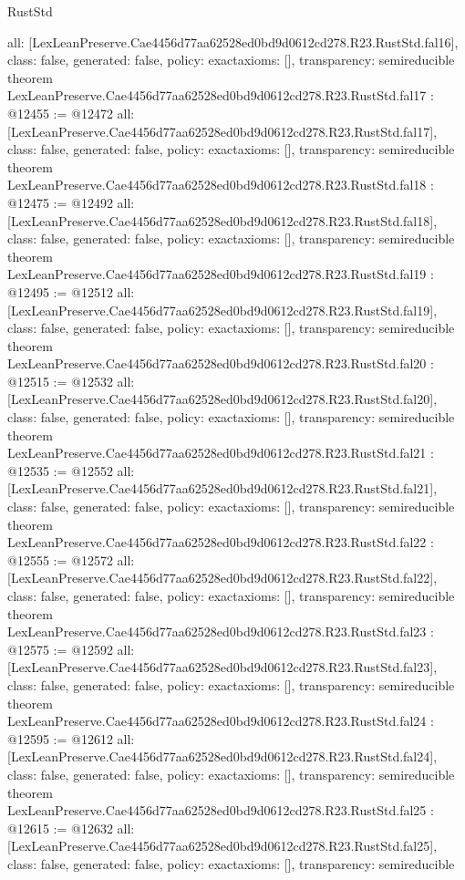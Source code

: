 \begin{lexlean}{RustStd}
\begin{coremodule}
{  all: [LexLeanPreserve.Cae4456d77aa62528ed0bd9d0612cd278.R23.RustStd.fal16],
  class: false,
  generated: false,
  policy: exact{axioms: []},
  transparency: semireducible
}
theorem LexLeanPreserve.Cae4456d77aa62528ed0bd9d0612cd278.R23.RustStd.fal17 : @12455 := @12472 {
  all: [LexLeanPreserve.Cae4456d77aa62528ed0bd9d0612cd278.R23.RustStd.fal17],
  class: false,
  generated: false,
  policy: exact{axioms: []},
  transparency: semireducible
}
theorem LexLeanPreserve.Cae4456d77aa62528ed0bd9d0612cd278.R23.RustStd.fal18 : @12475 := @12492 {
  all: [LexLeanPreserve.Cae4456d77aa62528ed0bd9d0612cd278.R23.RustStd.fal18],
  class: false,
  generated: false,
  policy: exact{axioms: []},
  transparency: semireducible
}
theorem LexLeanPreserve.Cae4456d77aa62528ed0bd9d0612cd278.R23.RustStd.fal19 : @12495 := @12512 {
  all: [LexLeanPreserve.Cae4456d77aa62528ed0bd9d0612cd278.R23.RustStd.fal19],
  class: false,
  generated: false,
  policy: exact{axioms: []},
  transparency: semireducible
}
theorem LexLeanPreserve.Cae4456d77aa62528ed0bd9d0612cd278.R23.RustStd.fal20 : @12515 := @12532 {
  all: [LexLeanPreserve.Cae4456d77aa62528ed0bd9d0612cd278.R23.RustStd.fal20],
  class: false,
  generated: false,
  policy: exact{axioms: []},
  transparency: semireducible
}
theorem LexLeanPreserve.Cae4456d77aa62528ed0bd9d0612cd278.R23.RustStd.fal21 : @12535 := @12552 {
  all: [LexLeanPreserve.Cae4456d77aa62528ed0bd9d0612cd278.R23.RustStd.fal21],
  class: false,
  generated: false,
  policy: exact{axioms: []},
  transparency: semireducible
}
theorem LexLeanPreserve.Cae4456d77aa62528ed0bd9d0612cd278.R23.RustStd.fal22 : @12555 := @12572 {
  all: [LexLeanPreserve.Cae4456d77aa62528ed0bd9d0612cd278.R23.RustStd.fal22],
  class: false,
  generated: false,
  policy: exact{axioms: []},
  transparency: semireducible
}
theorem LexLeanPreserve.Cae4456d77aa62528ed0bd9d0612cd278.R23.RustStd.fal23 : @12575 := @12592 {
  all: [LexLeanPreserve.Cae4456d77aa62528ed0bd9d0612cd278.R23.RustStd.fal23],
  class: false,
  generated: false,
  policy: exact{axioms: []},
  transparency: semireducible
}
theorem LexLeanPreserve.Cae4456d77aa62528ed0bd9d0612cd278.R23.RustStd.fal24 : @12595 := @12612 {
  all: [LexLeanPreserve.Cae4456d77aa62528ed0bd9d0612cd278.R23.RustStd.fal24],
  class: false,
  generated: false,
  policy: exact{axioms: []},
  transparency: semireducible
}
theorem LexLeanPreserve.Cae4456d77aa62528ed0bd9d0612cd278.R23.RustStd.fal25 : @12615 := @12632 {
  all: [LexLeanPreserve.Cae4456d77aa62528ed0bd9d0612cd278.R23.RustStd.fal25],
  class: false,
  generated: false,
  policy: exact{axioms: []},
  transparency: semireducible
}
\end{coremodule}
\end{lexlean}
